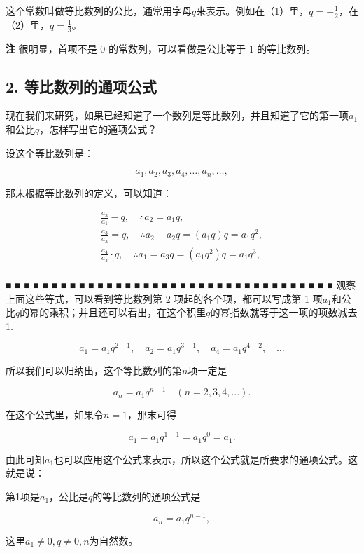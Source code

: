 这个常数叫做等比数列的公比，通常用字母\(q\)来表示。例如在（1）里，\(q = -\frac{1}{2}\)，在（2）里，\(q = \frac{1}{3}\)。

\textbf{注} 很明显，首项不是 0 的常数列，可以看做是公比等于 1
的等比数列。

\subsection{2. 等比数列的通项公式}

现在我们来研究，如果已经知道了一个数列是等比数列，并且知道了它的第一项\(a_1\)和公比\(q\)，怎样写出它的通项公式？

设这个等比数列是：

\[
a_{1}, a_{2}, a_{3}, a_{4}, \dots, a_{n}, \dots,
\]

那末根据等比数列的定义，可以知道：

\[
\begin{array}{l} \frac{a_{3}}{a_{1}} - q, \quad \therefore a_{2} = a_{1} q, \\ \frac{a_{3}}{a_{3}} = q, \quad \therefore a_{2} - a_{2} q = (a_{1} q) q = a_{1} q^{2}, \\ \frac{a_{4}}{a_{3}} \cdot q, \quad \therefore a_{1} = a_{3} q = (a_{1} q^{2}) q = a_{1} q^{3}, \\ \end{array}
\]

■ ■ ■ ■ ■ ■ ■ ■ ■ ■ ■ ■ ■ ■ ■ ■ ■ ■ ■ ■ ■ ■ ■ ■ ■ ■ ■ ■ ■ ■ ■ ■ ■ ■ ■ ■
观察上面这些等式，可以看到等比数列第 2 项起的各个项，都可以写成第 1
项\(a_1\)和公比\(q\)的幂的乘积；并且还可以看出，在这个积里\(q\)的幂指数就等于这一项的项数减去
1.

\[
a_{1} = a_{1} q^{2 - 1}, \quad a_{2} = a_{1} q^{3 - 1}, \quad a_{4} = a_{1} q^{4 - 2}, \quad \dots
\]

所以我们可以归纳出，这个等比数列的第\(n\)项一定是

\[
a_{n} = a_{1} q^{n - 1} \quad (n = 2, 3, 4, \dots).
\]

在这个公式里，如果令\(n = 1\)，那末可得

\[
a_{1} = a_{1} q^{1 - 1} = a_{1} q^{0} = a_{1}.
\]

由此可知\(a_{1}\)也可以应用这个公式来表示，所以这个公式就是所要求的通项公式。这就是说：

第1项是\(a_1\)，公比是\(q\)的等比数列的通项公式是

\[
a_{n} = a_{1} q^{n - 1}, \tag {IV}
\]

这里\(a_1 \neq 0, q \neq 0, n\)为自然数。

